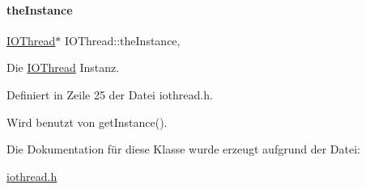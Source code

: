 \paragraph{\texorpdfstring{the\+Instance}{theInstance}}
{\footnotesize\ttfamily \mbox{\hyperlink{classIOThread}{I\+O\+Thread}}$\ast$ I\+O\+Thread\+::the\+Instance\hspace{0.3cm}{\ttfamily [static]}, {\ttfamily [private]}}



Die \mbox{\hyperlink{classIOThread}{I\+O\+Thread}} Instanz. 



Definiert in Zeile 25 der Datei iothread.\+h.



Wird benutzt von get\+Instance().



Die Dokumentation für diese Klasse wurde erzeugt aufgrund der Datei\+:\begin{DoxyCompactItemize}
\item 
\mbox{\hyperlink{iothread_8h}{iothread.\+h}}\end{DoxyCompactItemize}
